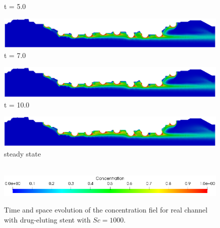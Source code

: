 \begin{figure}[H]
\begin{minipage}{.50\linewidth}
      t = 5.0
     \end{minipage}%
     \begin{minipage}{.50\linewidth}
      \centering
      \includegraphics[scale=0.18]{./02_chaps/cap_solution/figure/conc1000_RealStrut6.png}\\
      t = 7.0
     \end{minipage}
     \begin{minipage}{.50\linewidth}
     \medskip
      \centering
      \includegraphics[scale=0.18]{./02_chaps/cap_solution/figure/conc1000_RealStrut7.png}\\
      t = 10.0
     \end{minipage}%
     \begin{minipage}{.50\linewidth}
     \medskip
      \centering
      \includegraphics[scale=0.18]{./02_chaps/cap_solution/figure/conc1000_RealStrut8.png}\\
      steady state
     \end{minipage}\\[10pt]
      \centering
      \includegraphics[scale=0.5]{./02_chaps/cap_solution/figure/conc1_RealStrutScale.png}\\
     \medskip
    \caption{
Time and space evolution of the concentration fiel for real channel with drug-eluting stent with $Sc=1000$.}
     \label{conc field real stent sc 1000}
\end{figure}




\newpage


